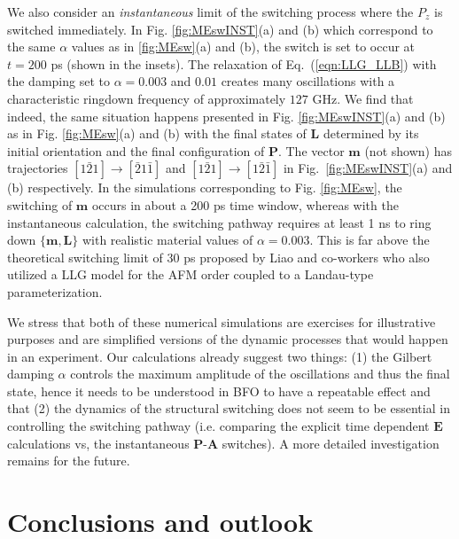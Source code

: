 \documentclass[%
 reprint,
superscriptaddress,
 amsmath,amssymb,
prb,
]{revtex4-1}
\begin{document}
%
We also consider an \emph{instantaneous} limit of the switching process where the $P_z$ is switched immediately.
%
In Fig. \ref{fig:MEswINST}(a) and (b) which correspond to the same $\alpha$ values as in \ref{fig:MEsw}(a) and (b), the switch is set to occur at $t = 200$ ps (shown in the insets).
%
The relaxation of Eq.~(\ref{eqn:LLG_LLB}) with the damping set to $\alpha = 0.003$ and $0.01$ creates many oscillations with a characteristic ringdown frequency of approximately $127$ GHz.
%
We find that indeed, the same situation happens presented in Fig. \ref{fig:MEswINST}(a) and (b) as in Fig. \ref{fig:MEsw}(a) and (b) with the final states of $\mathbf{L}$ determined by its initial orientation and the final configuration of $\mathbf{P}$.
%
The vector $\mathbf{m}$ (not shown) has trajectories $[1\bar{2}1]\to[\bar{2}1\bar{1}]$ and $[1\bar{2}1]\to[1\bar{2}\bar{1}]$ in Fig.~\ref{fig:MEswINST}(a) and (b) respectively.
%
In the simulations corresponding to Fig. \ref{fig:MEsw}, the switching of $\mathbf{m}$ occurs in about a 200 ps time window, whereas with the instantaneous calculation, the switching pathway requires at least 1 ns to ring down $\{\mathbf{m},\mathbf{L}\}$ with realistic material values of $\alpha = 0.003$. 
%
This is far above the theoretical switching limit of 30 ps proposed by Liao and co-workers\cite{Liao2020a, Liao2020b} who also utilized a LLG model for the AFM order coupled to a Landau-type parameterization.
%

%
We stress that both of these numerical simulations are exercises for illustrative purposes and are simplified versions of the dynamic processes that would happen in an experiment.
%
Our calculations already suggest two things: (1) the Gilbert damping $\alpha$ controls the maximum amplitude of the oscillations and thus the final state, hence it needs to be understood in BFO to have a repeatable effect and that (2) the dynamics of the structural switching does not seem to be essential in controlling the switching pathway (i.e. comparing the explicit time dependent $\mathbf{E}$ calculations vs, the instantaneous $\mathbf{P}$-$\mathbf{A}$ switches).
%
A more detailed investigation remains for the future.

%
\section{Conclusions and outlook}
%
\end{document}
